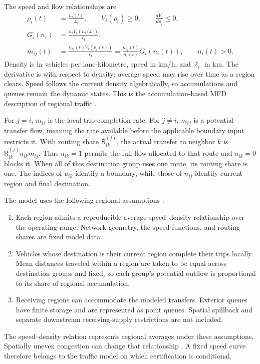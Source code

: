 \documentclass[preprint,12pt]{elsarticle}
\theoremstyle{definition}
\theoremstyle{plain}
\theoremstyle{definition}
\theoremstyle{plain}
\begin{document}
The speed and flow relationships are
\begin{equation}
\begin{aligned}
\rho_i(t)&=\frac{n_i(t)}{\mathcal L_i},\qquad
V_i(\rho_i)\ge0,\qquad \frac{dV_i}{d\rho_i}\le0,\\
G_i(n_i)&=\frac{n_i V_i(n_i/\mathcal L_i)}{\ell_i},\\
m_{ij}(t)&=\frac{n_{ij}(t)V_i(\rho_i(t))}{\ell_i}
          =\frac{n_{ij}(t)}{n_i(t)}G_i(n_i(t)),\qquad n_i(t)>0.
\end{aligned}
\label{eq:class-potential-flow}
\end{equation}
Density is in vehicles per lane-kilometre, speed in km/h, and $\ell_i$
in km. The derivative is with respect to density: average speed may rise
over time as a region clears. Speed follows the current density
algebraically, so accumulations and queues remain the dynamic states.
This is the accumulation-based MFD description of regional traffic
\cite{geroliminis2008existence,mariotte2017comparisons}.

For $j=i$, $m_{ii}$ is the local trip-completion rate. For $j\ne i$,
$m_{ij}$ is a potential transfer flow, meaning the rate available before
the applicable boundary input restricts it. With routing share
$\mathsf R_{ik}^{(j)}$, the actual transfer to neighbor $k$ is
$\mathsf R_{ik}^{(j)}u_{ik}m_{ij}$. Thus $u_{ik}=1$ permits the full
flow allocated to that route and $u_{ik}=0$ blocks it. When all of this
destination group uses one route, its routing share is one.
The indices of $u_{ik}$ identify a boundary, while those of $n_{ij}$
identify current region and final destination.

The model uses the following regional assumptions
\cite{geroliminis2011properties,geroliminis2013mpc,mohajerpoor2020hinf}:
\begin{enumerate}
\item Each region admits a reproducible average speed--density
relationship over the operating range. Network geometry, the speed
functions, and routing shares are fixed model data.
\item Vehicles whose destination is their current region complete their
trips locally. Mean distances traveled within a region are taken to be
equal across destination groups and fixed, so each group's potential
outflow is proportional to its share of regional accumulation.
\item Receiving regions can accommodate the modeled transfers. Exterior
queues have finite storage and are represented as point queues. Spatial
spillback and separate downstream receiving-supply restrictions are not
included.
\end{enumerate}
The speed--density relation represents regional averages under these
assumptions. Spatially uneven congestion can change that relationship
\cite{geroliminis2011properties}. A fixed speed curve therefore belongs
to the traffic model on which certification is conditional.
\end{document}
